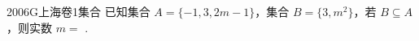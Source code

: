 
\begin{problem}{2006}{G}{上海卷}{1}{集合}
已知集合 $ A = \{-1, 3, 2m-1\} $，集合 $ B = \{3, m^2\} $，若 $ B \subseteq A $，则实数 $ m = $ \underline{\hspace{4em}}.
\end{problem}

\begin{answer}

\end{answer}

\begin{solutions}

\end{solutions}